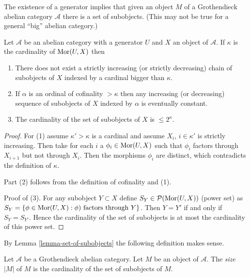 \noindent
The existence of a generator implies that given an object $M$ of a
Grothendieck abelian category $\mathcal{A}$ there is a set of subobjects.
(This may not be true for a general ``big'' abelian category.)

\begin{lemma}
\label{lemma-set-of-subobjects}
Let $\mathcal{A}$ be an abelian category with a generator $U$ and
$X$ an object of $\mathcal{A}$. If $\kappa$ is the cardinality of
$\mathop{\mathrm{Mor}}\nolimits(U, X)$ then
\begin{enumerate}
\item There does not exist a strictly increasing
(or strictly decreasing) chain of subobjects
of $X$ indexed by a cardinal bigger than $\kappa$.
\item If $\alpha$ is an ordinal of cofinality $> \kappa$
then any increasing (or decreasing) sequence of subobjects
of $X$ indexed by $\alpha$ is eventually constant.
\item The cardinality of the set of subobjects of $X$
is $\leq 2^\kappa$.
\end{enumerate}
\end{lemma}

\begin{proof}
For (1) assume $\kappa' > \kappa$ is a cardinal and assume
$X_i$, $i \in \kappa'$ is strictly increasing. Then take for
each $i$ a $\phi_i \in \mathop{\mathrm{Mor}}\nolimits(U, X)$ such that $\phi_i$ factors through
$X_{i + 1}$ but not through $X_i$. Then the morphisms $\phi_i$
are distinct, which contradicts the definition of $\kappa$.

\medskip\noindent
Part (2) follows from the definition of cofinality and (1).

\medskip\noindent
Proof of (3). For any subobject $Y \subset X$
define $S_Y \in \mathcal{P}(\mathop{\mathrm{Mor}}\nolimits(U, X))$ (power set) as
$S_Y = \{\phi \in \mathop{\mathrm{Mor}}\nolimits(U,X) : \phi)\text{ factors through }Y\}$.
Then $Y = Y'$ if and only if $S_Y = S_{Y'}$. Hence the cardinality
of the set of subobjects is at most the cardinality of this power set.
\end{proof}

\noindent
By Lemma \ref{lemma-set-of-subobjects} the following definition makes sense.

\begin{definition}
\label{definition-size}
Let $\mathcal{A}$ be a Grothendieck abelian category.
Let $M$ be an object of $\mathcal{A}$.
The {\it size} $|M|$ of $M$ is the cardinality of the set of subobjects
of $M$.
\end{definition}

